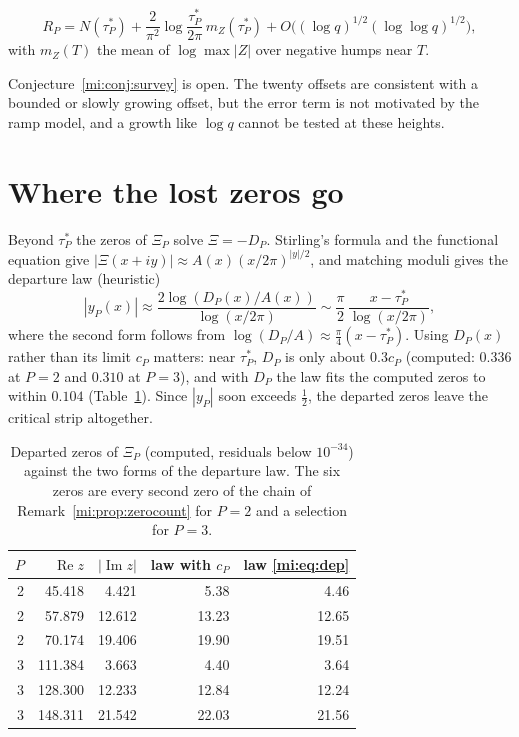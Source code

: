 \begin{conjecture}\label{mi:conj:survey}
\[
R_P=N(\tau_P^*)+\frac2{\pi^2}\log\frac{\tau_P^*}{2\pi}\,m_Z(\tau_P^*)+O\big((\log q)^{1/2}(\log\log q)^{1/2}\big),
\]
with $m_Z(T)$ the mean of $\log\max|Z|$ over negative humps near $T$.
\end{conjecture}

Conjecture~\ref{mi:conj:survey} is open. The twenty offsets are consistent with a bounded or slowly growing offset, but the error term is not motivated by the ramp model, and a growth like $\log q$ cannot be tested at these heights.

\section{Where the lost zeros go}\label{mi:sec:lost}

Beyond $\tau_P^*$ the zeros of $\Xi_P$ solve $\Xi=-D_P$. Stirling's formula and the functional equation give $|\Xi(x+iy)|\approx A(x)(x/2\pi)^{|y|/2}$, and matching moduli gives the departure law (heuristic)
\begin{equation}\label{mi:eq:dep}
|y_P(x)|\approx\frac{2\log(D_P(x)/A(x))}{\log(x/2\pi)}\sim\frac\pi2\,\frac{x-\tau_P^*}{\log(x/2\pi)} ,
\end{equation}
where the second form follows from $\log(D_P/A)\approx\frac\pi4(x-\tau_P^*)$. Using $D_P(x)$ rather than its limit $c_P$ matters: near $\tau_P^*$, $D_P$ is only about $0.3c_P$ (computed: $0.336$ at $P=2$ and $0.310$ at $P=3$), and with $D_P$ the law fits the computed zeros to within $0.104$ (Table~\ref{mi:tab:dep}). Since $|y_P|$ soon exceeds $\frac12$, the departed zeros leave the critical strip altogether.

\begin{table}[ht]
\centering
\footnotesize
\begin{tabular}{rrrrr}
\toprule
$P$ & $\operatorname{Re}z$ & $|\operatorname{Im}z|$ & law with $c_P$ & law \eqref{mi:eq:dep} \\
\midrule
2 & 45.418 & 4.421 & 5.38 & 4.46 \\
2 & 57.879 & 12.612 & 13.23 & 12.65 \\
2 & 70.174 & 19.406 & 19.90 & 19.51 \\
3 & 111.384 & 3.663 & 4.40 & 3.64 \\
3 & 128.300 & 12.233 & 12.84 & 12.24 \\
3 & 148.311 & 21.542 & 22.03 & 21.56 \\
\bottomrule
\end{tabular}
\caption{Departed zeros of $\Xi_P$ (computed, residuals below $10^{-34}$) against the two forms of the departure law. The six zeros are every second zero of the chain of Remark~\ref{mi:prop:zerocount} for $P=2$ and a selection for $P=3$.}
\label{mi:tab:dep}
\end{table}

